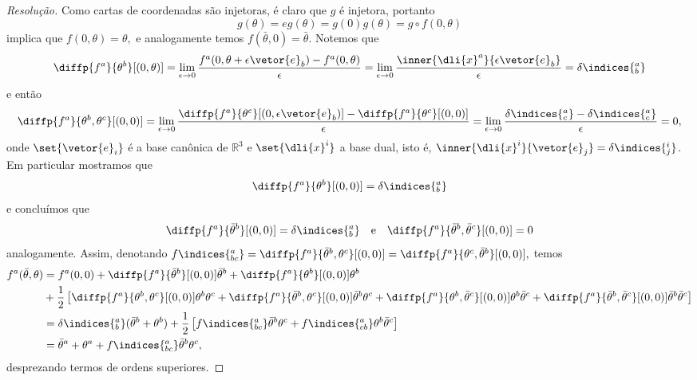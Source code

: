\begin{proof}[Resolução]
   Como cartas de coordenadas são injetoras, é claro que \(g\) é injetora, portanto 
   \begin{equation*}
      g(\theta) = eg(\theta) = g(0) g(\theta) = g\circ f(0,\theta)
   \end{equation*}
   implica que \(f(0,\theta) = \theta,\) e analogamente temos \(f(\bar{\theta}, 0) = \bar{\theta}.\) Notemos que
   \begin{equation*}
      \diffp{f^a}{\theta^b}[(0,\theta)] = \lim_{\epsilon \to 0}{\frac{f^a(0, \theta + \epsilon \vetor{e}_b) - f^a(0,\theta)}{\epsilon}} = \lim_{\epsilon \to 0}{\frac{\inner{\dli{x}^a}{\epsilon \vetor{e}_b}}{\epsilon}} = \delta\indices{^a_b}
   \end{equation*}
   e então 
   \begin{equation*}
      \diffp{f^a}{\theta^b,\theta^c}[(0,0)] = \lim_{\epsilon \to 0}{\frac{\diffp{f^a}{\theta^c}[(0, \epsilon \vetor{e}_b)] - \diffp{f^a}{\theta^c}[(0,0)]}{\epsilon}} = \lim_{\epsilon \to 0}{\frac{\delta\indices{^a_c} - \delta\indices{^a_c}}{\epsilon}} = 0,
   \end{equation*}
   onde \(\set{\vetor{e}_i}\) é a base canônica de \(\mathbb{R}^3\) e \(\set{\dli{x}^i}\) a base dual, isto é, \(\inner{\dli{x}^i}{\vetor{e}_j} = \delta\indices{^i_j}\). Em particular mostramos que 
   \begin{equation*}
      \diffp{f^a}{\theta^b}[(0,0)] = \delta\indices{^a_b}
   \end{equation*}
   e concluímos que
   \begin{equation*}
      \diffp{f^a}{\bar{\theta}^b}[(0,0)] = \delta\indices{^a_b}
      \quad\text{e}\quad
      \diffp{f^a}{\bar{\theta}^b,\bar{\theta}^c}[(0,0)] = 0
   \end{equation*}
   analogamente. Assim, denotando \(f\indices{^a_{bc}} = \diffp{f^a}{\bar{\theta}^b,\theta^c}[(0,0)] = \diffp{f^a}{\theta^c,\bar{\theta}^b}[(0,0)],\) temos
   \begin{align*}
      f^a(\bar{\theta}, \theta) 
       &= f^a(0,0) + \diffp{f^a}{\bar{\theta}^b}[(0,0)] \bar{\theta}^b + \diffp{f^a}{\theta^b}[(0,0)]\theta^b\\
       &{}+ \frac12 \left[\diffp{f^a}{\theta^b,\theta^c}[(0,0)] \theta^b \theta^c + \diffp{f^a}{\bar{\theta}^b,\theta^c}[(0,0)] \bar{\theta}^b \theta^c + \diffp{f^a}{\theta^b,\bar{\theta}^c}[(0,0)] \theta^b \bar{\theta}^c + \diffp{f^a}{\bar{\theta}^b,\bar{\theta}^c}[(0,0)] \bar{\theta}^b \bar{\theta}^c \right]\\
       &= \delta\indices{^a_b}(\bar{\theta}^b + \theta^b) + \frac12\left[ f\indices{^a_{bc}} \bar{\theta}^b \theta^c + f\indices{^a_{cb}}\theta^b \bar{\theta}^c\right]\\
       &= \bar{\theta}^a + \theta^a + f\indices{^a_{bc}}\bar{\theta}^b\theta^c,
   \end{align*}
   desprezando termos de ordens superiores.


\end{proof}

